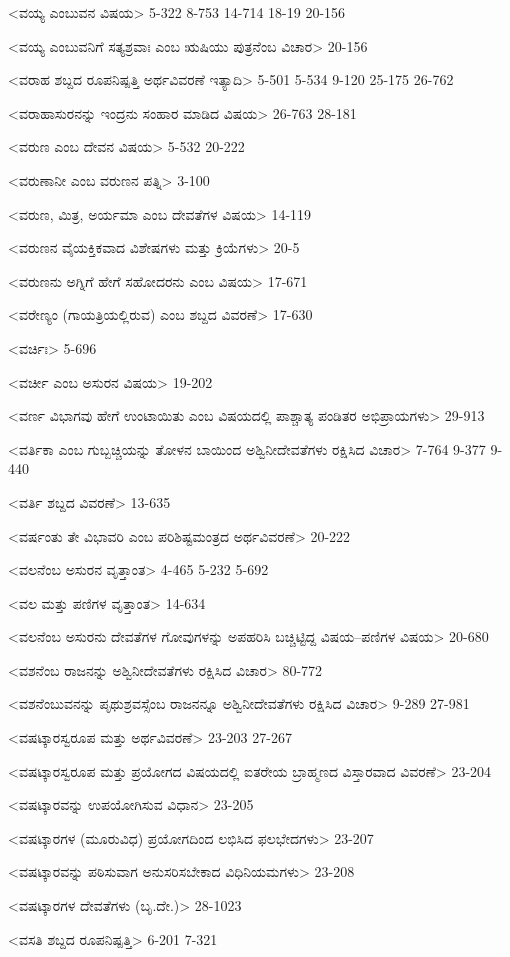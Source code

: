 <ವಯ್ಯ ಎಂಬುವನ ವಿಷಯ>
5-322
8-753
14-714
18-19
20-156

<ವಯ್ಯ ಎಂಬುವನಿಗೆ ಸತ್ಯಶ್ರವಾಃ ಎಂಬ ಋಷಿಯು ಪುತ್ರನೆಂಬ ವಿಚಾರ>
20-156

<ವರಾಹ ಶಬ್ದದ ರೂಪನಿಷ್ಪತ್ತಿ ಅರ್ಥವಿವರಣೆ ಇತ್ಯಾದಿ>
5-501 
5-534
9-120
25-175
26-762

<ವರಾಹಾಸುರನನ್ನು ಇಂದ್ರನು ಸಂಹಾರ ಮಾಡಿದ ವಿಷಯ>
26-763
28-181

<ವರುಣ ಎಂಬ ದೇವನ ವಿಷಯ>
5-532
20-222

<ವರುಣಾನೀ ಎಂಬ ವರುಣನ ಪತ್ನಿ>
3-100

<ವರುಣ, ಮಿತ್ರ, ಅರ್ಯಮಾ ಎಂಬ ದೇವತೆಗಳ ವಿಷಯ>
14-119

<ವರುಣನ ವೈಯಕ್ತಿಕವಾದ ವಿಶೇಷಗಳು ಮತ್ತು ಕ್ರಿಯೆಗಳು>
20-5

<ವರುಣನು ಅಗ್ನಿಗೆ ಹೇಗೆ ಸಹೋದರನು ಎಂಬ ವಿಷಯ>
17-671

<ವರೇಣ್ಯಂ (ಗಾಯತ್ರಿಯಲ್ಲಿರುವ) ಎಂಬ ಶಬ್ದದ ವಿವರಣೆ>
17-630

<ವರ್ಚಿಃ>
5-696

<ವರ್ಚೀ ಎಂಬ ಅಸುರನ ವಿಷಯ>
19-202

<ವರ್ಣ ವಿಭಾಗವು ಹೇಗೆ ಉಂಟಾಯಿತು ಎಂಬ ವಿಷಯದಲ್ಲಿ ಪಾಶ್ಚಾತ್ಯ ಪಂಡಿತರ ಅಭಿಪ್ರಾಯಗಳು>
29-913

<ವರ್ತಿಕಾ ಎಂಬ ಗುಬ್ಬಚ್ಚಿಯನ್ನು ತೋಳನ ಬಾಯಿಂದ ಅಶ್ವಿನೀದೇವತೆಗಳು ರಕ್ಷಿಸಿದ ವಿಚಾರ>
7-764
9-377 
9-440


<ವರ್ತಿ ಶಬ್ದದ ವಿವರಣೆ>
13-635

<ವರ್ಷಂತು ತೇ ವಿಭಾವರಿ ಎಂಬ ಪರಿಶಿಷ್ಟಮಂತ್ರದ ಅರ್ಥವಿವರಣೆ>
20-222

<ವಲನೆಂಬ ಅಸುರನ ವೃತ್ತಾಂತ>
4-465
5-232
5-692

<ವಲ ಮತ್ತು ಪಣಿಗಳ ವೃತ್ತಾಂತ>
14-634

<ವಲನೆಂಬ ಅಸುರನು ದೇವತೆಗಳ ಗೋವುಗಳನ್ನು ಅಪಹರಿಸಿ ಬಚ್ಚಿಟ್ಟಿದ್ದ ವಿಷಯ–ಪಣಿಗಳ ವಿಷಯ>
20-680

<ವಶನೆಂಬ ರಾಜನನ್ನು ಅಶ್ವಿನೀದೇವತೆಗಳು ರಕ್ಷಿಸಿದ ವಿಚಾರ>
80-772

<ವಶನೆಂಬುವನನ್ನು ಪೃಥುಶ್ರವಸ್ಸೆಂಬ ರಾಜನನ್ನೂ ಅಶ್ವಿನೀದೇವತೆಗಳು ರಕ್ಷಿಸಿದ ವಿಚಾರ>
9-289
27-981

<ವಷಟ್ಕಾರಸ್ವರೂಪ ಮತ್ತು ಅರ್ಥವಿವರಣೆ>
23-203
27-267

<ವಷಟ್ಕಾರಸ್ವರೂಪ ಮತ್ತು ಪ್ರಯೋಗದ ವಿಷಯದಲ್ಲಿ ಐತರೇಯ ಬ್ರಾಹ್ಮಣದ ವಿಸ್ತಾರವಾದ ವಿವರಣೆ>
23-204

<ವಷಟ್ಕಾರವನ್ನು ಉಪಯೋಗಿಸುವ ವಿಧಾನ>
23-205

<ವಷಟ್ಕಾರಗಳ (ಮೂರುವಿಧ) ಪ್ರಯೋಗದಿಂದ ಲಭಿಸಿದ ಫಲಭೇದಗಳು>
23-207

<ವಷಟ್ಕಾರವನ್ನು ಪಠಿಸುವಾಗ ಅನುಸರಿಸಬೇಕಾದ ವಿಧಿನಿಯಮಗಳು>
23-208

<ವಷಟ್ಕಾರಗಳ ದೇವತೆಗಳು (ಬೃ.ದೇ.)>
28-1023

<ವಸತಿ ಶಬ್ದದ ರೂಪನಿಷ್ಪತ್ತಿ>
6-201 
7-321

